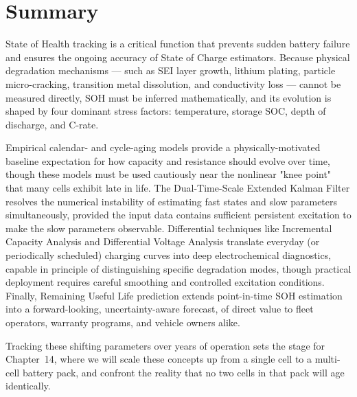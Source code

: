 \section{Summary}
\label{sec:13_summary}

State of Health tracking is a critical function that prevents sudden battery failure and ensures the ongoing accuracy of State of Charge estimators. Because physical degradation mechanisms — such as SEI layer growth, lithium plating, particle micro-cracking, transition metal dissolution, and conductivity loss — cannot be measured directly, SOH must be inferred mathematically, and its evolution is shaped by four dominant stress factors: temperature, storage SOC, depth of discharge, and C-rate.

Empirical calendar- and cycle-aging models provide a physically-motivated baseline expectation for how capacity and resistance should evolve over time, though these models must be used cautiously near the nonlinear "knee point" that many cells exhibit late in life. The Dual-Time-Scale Extended Kalman Filter resolves the numerical instability of estimating fast states and slow parameters simultaneously, provided the input data contains sufficient persistent excitation to make the slow parameters observable. Differential techniques like Incremental Capacity Analysis and Differential Voltage Analysis translate everyday (or periodically scheduled) charging curves into deep electrochemical diagnostics, capable in principle of distinguishing specific degradation modes, though practical deployment requires careful smoothing and controlled excitation conditions. Finally, Remaining Useful Life prediction extends point-in-time SOH estimation into a forward-looking, uncertainty-aware forecast, of direct value to fleet operators, warranty programs, and vehicle owners alike.

Tracking these shifting parameters over years of operation sets the stage for Chapter~14, where we will scale these concepts up from a single cell to a multi-cell battery pack, and confront the reality that no two cells in that pack will age identically.

  

